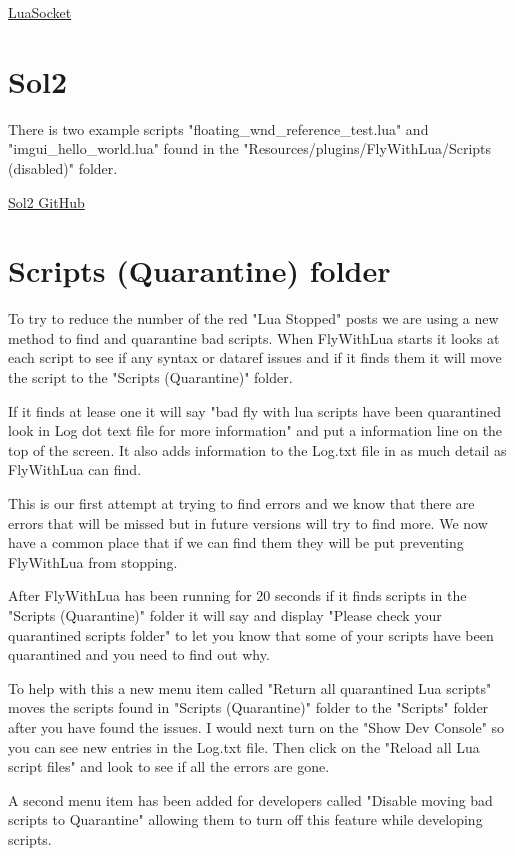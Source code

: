 \documentclass[11pt,parskip=half,a4paper]{scrartcl}
\begin{document}
\href{https://github.com/diegonehab/luasocket}{LuaSocket}

\section{Sol2}

There is two example scripts "floating\_wnd\_reference\_test.lua" and "imgui\_hello\_world.lua" found in the "Resources/plugins/FlyWithLua/Scripts (disabled)" folder.

\href{https://github.com/ThePhD/sol2}{Sol2 GitHub}


\newpage
\section{Scripts (Quarantine) folder}

To try to reduce the number of the red "Lua Stopped" posts we are using a new method to find and quarantine bad scripts. When FlyWithLua starts it looks at each script to see if any syntax or dataref issues and if it finds them it will move the script to the "Scripts (Quarantine)" folder.

If it finds at lease one it will say "bad fly with lua scripts have been quarantined look in Log dot text file for more information" and put a information line on the top of the screen. It also adds information to the Log.txt file in as much detail as FlyWithLua can find.

This is our first attempt at trying to find errors and we know that there are errors that will be missed but in future versions will try to find more. We now have a common place that if we can find them they will be put preventing FlyWithLua from stopping.

After FlyWithLua has been running for 20 seconds if it finds scripts in the "Scripts (Quarantine)" folder it will say and display "Please check your quarantined scripts folder" to let you know that some of your scripts have been quarantined and you need to find out why.

To help with this a new menu item called "Return all quarantined Lua scripts" moves the scripts found  in "Scripts (Quarantine)" folder to the "Scripts" folder after you have found the issues. I would next turn on the "Show Dev Console" so you can see new entries in the Log.txt file. Then click on the "Reload all Lua script files" and look to see if all the errors are gone.

A second menu item has been added for developers called "Disable moving bad scripts to Quarantine" allowing them to turn off this feature while developing scripts. \newline
\end{document}
